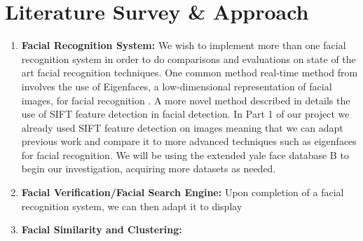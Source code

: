 \documentclass[11pt]{article} %
\theoremstyle{plain}
\theoremstyle{definition}
\theoremstyle{remark}
\numberwithin{equation}{section} %
\numberwithin{figure}{section} %
\numberwithin{table}{section} %
\begin{document}
\section{Literature Survey \& Approach}





\begin{enumerate}
  \item \textbf{Facial Recognition System:} We wish to implement more than one facial recognition system in order to do comparisons and evaluations on state of the art facial recognition techniques. One common method real-time method from involves the use of Eigenfaces, a low-dimensional representation of facial images, for facial recognition \citep{turk1991eigenfaces}. A more novel method described in \citep{krivzaj2010adaptation} details the use of SIFT feature detection in facial detection. In Part 1 of our project we already used SIFT feature detection on images meaning that we can adapt previous work and compare it to more advanced techniques such as eigenfaces for facial recognition. We will be using the extended yale face database B to begin our investigation, acquiring more datasets as needed. 

  \item \textbf{Facial Verification/Facial Search Engine:} 
  Upon completion of a facial recognition system, we can then adapt it to display 

  \item \textbf{Facial Similarity and Clustering:}
\end{enumerate}


\end{document}
